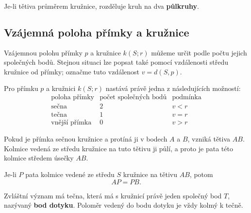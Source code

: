 \documentclass[12pt,a4paper]{article}
\begin{document}
Je-li tětiva průměrem kružnice, rozděluje kruh na dva \textbf{půlkruhy}.

\subsection{Vzájemná poloha přímky a kružnice}

Vzájemnou polohu přímky $p$ a kružnice $k(S;r)$ můžeme určit podle počtu jejich společných bodů. Stejnou situaci lze
popsat také pomocí vzdálenosti středu kružnice od přímky; označme tuto vzdálenost $v=d(S,p)$.

\begin{definitionbox}
    Pro přímku $p$ a kružnici $k(S;r)$ nastává právě jedna z následujících možností:
    \[
    \begin{array}{c|c|c}
        \text{poloha přímky} & \text{počet společných bodů} & \text{podmínka} \\
        \hline
        \text{sečna} & 2 & v<r \\
        \text{tečna} & 1 & v=r \\
        \text{vnější přímka} & 0 & v>r
    \end{array}
    \]
\end{definitionbox}

\begin{center}
\end{center}

Pokud je přímka sečnou kružnice a protíná ji v bodech $A$ a $B$, vzniká tětiva $AB$. Kolmice vedená ze středu kružnice
na tuto tětivu ji půlí, a proto je pata této kolmice středem úsečky $AB$.

\begin{notebox}
    Je-li $P$ pata kolmice vedené ze středu $S$ kružnice na tětivu $AB$, potom
    \[
        AP=PB.
    \]
\end{notebox}

Zvláštní význam má tečna, která má s kružnicí právě jeden společný bod $T$, nazývaný \textbf{bod dotyku}. Poloměr
vedený do bodu dotyku je vždy kolmý k tečně.
\end{document}
